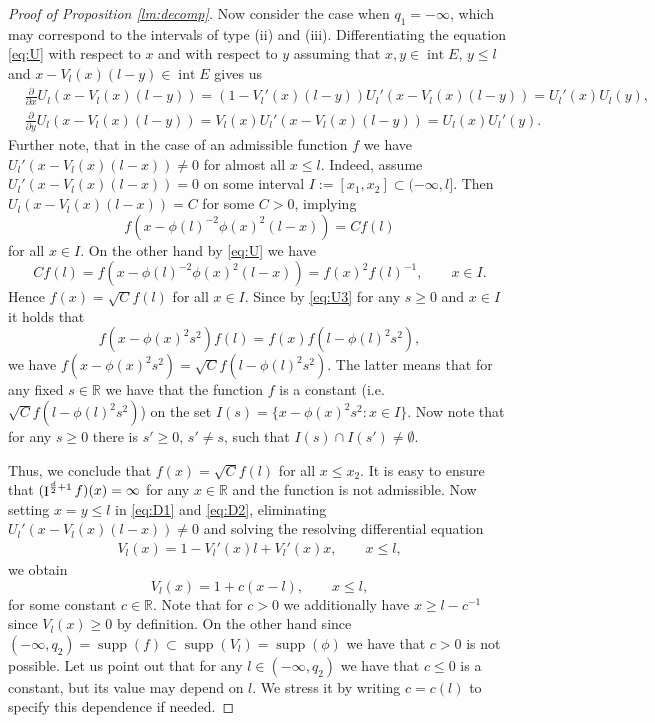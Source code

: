 \documentclass[11pt,a4paper]{article}
\theoremstyle{plain}
\theoremstyle{definition}
\theoremstyle{remark}
\DeclareMathOperator\supp{supp}
\def\RR{\mathbb{R}}
\newcommand{\frI}{\mathop{\mathrm{I}}\nolimits}
\newcommand{\inter}{\operatorname{int}}
\begin{document}
\begin{proof}[Proof of Proposition \ref{lm:decomp}]
    Now consider the case when $q_1=-\infty$, which may correspond to the intervals of type (ii) and (iii). Differentiating the equation \eqref{eq:U} with respect to $x$ and with respect to $y$ assuming that $x,y\in\inter E$, $y\leq l$ and $x-V_l(x)(l-y)\in\inter E$ gives us
    \begin{align}
        &\frac{\partial}{\partial x} U_l(x-V_l(x)(l-y)) = (1-V_l'(x)(l-y))U_l'(x-V_l(x)(l-y))=U_l'(x)U_l(y), \label{eq:D1}\\
        &\frac{\partial}{\partial y} U_l(x-V_l(x)(l-y)) = V_l(x)U_l'(x-V_l(x)(l-y))=U_l(x)U_l'(y). \label{eq:D2}
    \end{align}   
    Further note, that in the case of an admissible function $f$ we have $U_l'(x-V_l(x)(l-x))\neq 0$ for almost all $x\leq l$. Indeed, assume $U_l'(x-V_l(x)(l-x))=0$ on some interval $I:=[x_1,x_2]\subset(-\infty,l]$. Then $U_l(x-V_l(x)(l-x))=C$ for some $C>0$, implying 
    \[
        f(x-\phi(l)^{-2}\phi(x)^2(l-x))= C f(l)
    \]
    for all $x\in I$. On the other hand by \eqref{eq:U} we have
    \[
        Cf(l)=f(x-\phi(l)^{-2}\phi(x)^2(l-x)) =f(x)^2f(l)^{-1},\qquad x\in I.
    \] 
    Hence $f(x)=\sqrt{C}f(l)$ for all $x\in I$. Since by \eqref{eq:U3} for any $s\ge 0$ and $x\in I$ it holds that
    \[
        f(x-\phi(x)^2s^2)f(l)= f(x)f(l-\phi(l)^2s^2),
    \]
    we have $f(x-\phi(x)^2s^2)= \sqrt{C}f(l-\phi(l)^2s^2)$. The latter means that for any fixed $s\in\RR$ we have that the function $f$ is a constant (i.e. $\sqrt{C}f(l-\phi(l)^2s^2)$) on the set $I(s)=\{x-\phi(x)^2s^2\colon x\in I\}$. Now note that for any $s\ge 0$ there is $s'\ge 0$, $s'\neq s$, such that $I(s)\cap I(s')\neq \emptyset$.
    
    Thus, we conclude that $f(x)=\sqrt{C}f(l)$ for all $x\leq x_2$. It is easy to ensure that $(\frI^{{d\over 2}+1}f)(x)=\infty$ for any $x\in\RR$ and the function is not admissible. Now setting $x=y\leq l$ in \eqref{eq:D1} and \eqref{eq:D2}, eliminating $U_l'(x-V_l(x)(l-x))\neq 0$ and solving the resolving differential equation
    \begin{align*}
        V_l(x)=1-V_l'(x)l+V_l'(x)x,\qquad x\leq l,
    \end{align*}
    we obtain 
    \begin{equation}\label{eq:V2}
        V_l(x)=1+c(x-l),\qquad x\leq l,
    \end{equation}
    for some constant $c\in \RR$. Note that for $c>0$ we additionally have $x\ge l-c^{-1}$ since $V_l(x)\ge 0$ by definition. On the other hand since $(-\infty,q_2)=\supp(f)\subset\supp(V_l)=\supp(\phi)$ we have that $c>0$ is not possible. Let us point out that for any $l\in(-\infty,q_2)$ we have that $c\leq 0$ is a constant, but its value may depend on $l$. We stress it by writing $c=c(l)$ to specify this dependence if needed.


\end{proof}
\end{document}
